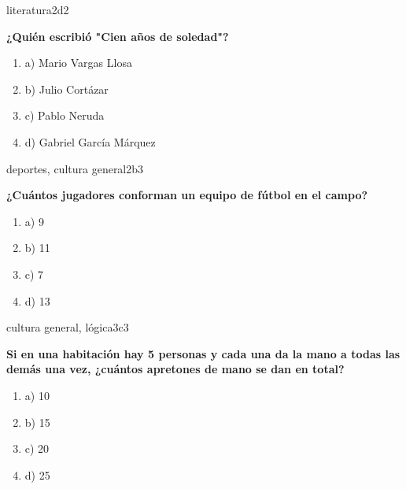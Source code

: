 \documentclass{article}
\begin{document}
\begin{question}{4}{literatura}{2}{d}{2}{
\textbf{¿Quién escribió "Cien años de soledad"?}\\

\begin{enumerate}
    \item a) Mario Vargas Llosa
    \item b) Julio Cortázar
    \item c) Pablo Neruda
    \item d) Gabriel García Márquez
\end{enumerate}
}
\end{question}


\begin{question}{5}{deportes, cultura general}{2}{b}{3}{
\textbf{¿Cuántos jugadores conforman un equipo de fútbol en el campo?}\\

\begin{enumerate}
    \item a) 9
    \item b) 11
    \item c) 7
    \item d) 13
\end{enumerate}
}
\end{question}

\begin{question}{6}{cultura general, lógica}{3}{c}{3}{
\textbf{Si en una habitación hay 5 personas y cada una da la mano a todas las demás una vez, ¿cuántos apretones de mano se dan en total?}\\

\begin{enumerate}
    \item a) 10
    \item b) 15
    \item c) 20
    \item d) 25
\end{enumerate}
}
\end{question}
\end{document}

